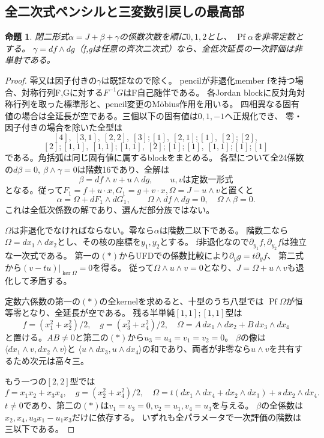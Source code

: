 \documentclass[a4paper,11pt]{ltjsarticle}
\newtheorem{proposition}{命題}[section]
\theoremstyle{definition}
\begin{document}
\subsection{全二次式ペンシルと三変数引戻しの最高部}
\begin{proposition}\label{prop:unimodular-quadratic-pencil}
閉二形式$\alpha=J+\beta+\gamma$の係数次数を順に$0,1,2$とし、
$\operatorname{Pf}\alpha$を非零定数とする。
$\gamma=df\wedge dg$（f,gは任意の斉次二次式）なら、全低次延長の一次評価は非単射である。
\end{proposition}
\begin{proof}
零又は因子付きの$\gamma$は既証なので除く。
pencilが非退化member fを持つ場合、対称行列F,Gに対する$F^{-1}G$はF自己随伴である。
各Jordan blockに反対角対称行列を取った標準形と、pencil変更のM\"obius作用を用いる。
四相異なる固有値の場合は全延長が空である。三個以下の固有値は$0,1,-1$へ正規化でき、
零・因子付きの場合を除いた全型は
\[
 [4],\ [3,1],\ [2,2],\ [3];[1],\ [2,1];[1],\ [2];[2],
\]
\[
 [2];[1,1],\ [1,1];[1,1],\ [2];[1];[1],\ [1,1];[1];[1]
\]
である。角括弧は同じ固有値に属するblockをまとめる。
各型について全24係数の$d\beta=0,\ \beta\wedge\gamma=0$は階数16であり、全解は
\[
 \beta=df\wedge v+u\wedge dg,
 \qquad u,v\text{は定数一形式}
\]
となる。従って$F_1=f+u\cdot x,G_1=g+v\cdot x,\Omega=J-u\wedge v$と置くと
\[
 \alpha=\Omega+dF_1\wedge dG_1,\qquad
 \Omega\wedge df\wedge dg=0,\quad \Omega\wedge\beta=0.       \tag{\ast}
\]
これは全低次係数の解であり、選んだ部分族ではない。

$\Omega$は非退化でなければならない。零なら$\alpha$は階数二以下である。
階数二なら$\Omega=dx_1\wedge dx_2$とし、その核の座標を$y_1,y_2$とする。
f非退化なので$\partial_{y_1}f,\partial_{y_2}f$は独立な一次式である。
第一の$(\ast)$からUFDでの係数比較により$\partial_y g=t\partial_y f$、
第二式から$(v-tu)|_{\ker\Omega}=0$を得る。
従って$\Omega\wedge u\wedge v=0$となり、$J=\Omega+u\wedge v$も退化して矛盾する。

定数六係数の第一の$(\ast)$の全kernelを求めると、十型のうち八型では
$\operatorname{Pf}\Omega$が恒等零となり、全延長が空である。
残る半単純$[1,1];[1,1]$型は
\[
 f=(x_1^2+x_2^2)/2,\quad g=(x_3^2+x_4^2)/2,\quad
 \Omega=A\,dx_1\wedge dx_2+B\,dx_3\wedge dx_4
\]
と置ける。$AB\ne0$と第二の$(\ast)$から$u_3=u_4=v_1=v_2=0$。
$\beta$の像は$\langle dx_1\wedge v,dx_2\wedge v\rangle$と
$\langle u\wedge dx_3,u\wedge dx_4\rangle$の和であり、両者が非零なら$u\wedge v$を共有するため次元は高々三。

もう一つの$[2,2]$型では
\[
 f=x_1x_2+x_3x_4,\quad g=(x_2^2+x_4^2)/2,\quad
 \Omega=t(dx_1\wedge dx_4+dx_2\wedge dx_3)+s\,dx_2\wedge dx_4.
\]
$t\ne0$であり、第二の$(\ast)$は$v_1=v_3=0,v_2=u_1,v_4=u_3$を与える。
$\beta$の全係数は$x_2,x_4,u_3x_1-u_1x_3$だけに依存する。
いずれも全パラメータで一次評価の階数は三以下である。


\end{proof}
\end{document}
